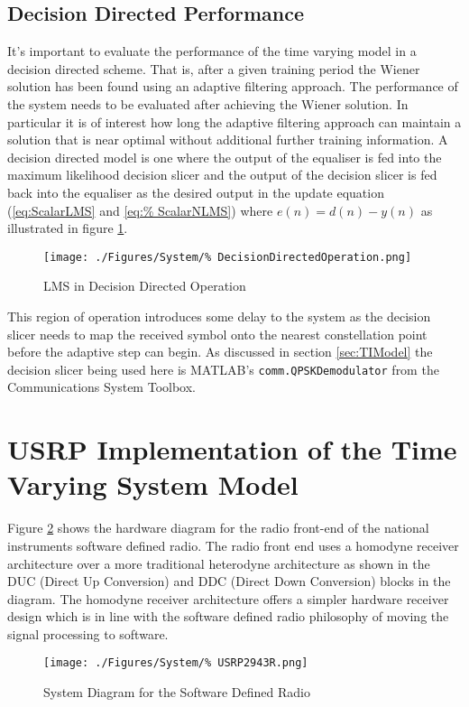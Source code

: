 \subsection{Decision Directed Performance}

It's important to evaluate the performance of the time varying model in a %
decision directed scheme. That is, after a given training period the Wiener %
solution has been found using an adaptive filtering approach. The performance %
of the system needs to be evaluated after achieving the Wiener solution. In %
particular it is of interest how long the adaptive filtering approach can %
maintain a solution that is near optimal without additional further training %
information. A decision directed model is one where the output of the %
equaliser is fed into the maximum likelihood decision slicer and the output %
of the decision slicer is fed back into the equaliser as the desired %
output in the update equation (\ref{eq:ScalarLMS} and \ref{eq:%
ScalarNLMS}) where $e(n) = d(n) - y(n)$ as illustrated in figure %
\ref{fig:DDLMS}.
\begin{figure}[ht]
	\texttt{[image: ./Figures/System/\%
	DecisionDirectedOperation.png]}
	\caption{LMS in Decision Directed Operation}
	\label{fig:DDLMS}
\end{figure}
This region of operation introduces some delay to the system as %
the decision slicer needs to map the received symbol onto the %
nearest constellation point before the adaptive step can begin. %
As discussed in section \ref{sec:TIModel} the decision slicer being used %
here is MATLAB's \texttt{comm.QPSKDemodulator} from the %
Communications System Toolbox.

\section{USRP Implementation of the Time Varying System Model}

Figure \ref{fig:USRPDiagram} shows the hardware diagram %
for the radio front-end of the national instruments %
software defined radio. The radio front end uses a homodyne %
receiver architecture over a more traditional heterodyne %
architecture as shown in the DUC (Direct Up Conversion) and %
DDC (Direct Down Conversion) blocks in the diagram. The homodyne %
receiver architecture offers a simpler hardware receiver design %
which is in line with the software defined radio philosophy of %
moving the signal processing to software.
\begin{figure}[ht]
	\texttt{[image: ./Figures/System/\%
	USRP2943R.png]}
	\caption{System Diagram for the Software Defined Radio%
	\cite{USRPDiagram}}
	\label{fig:USRPDiagram}
\end{figure}

